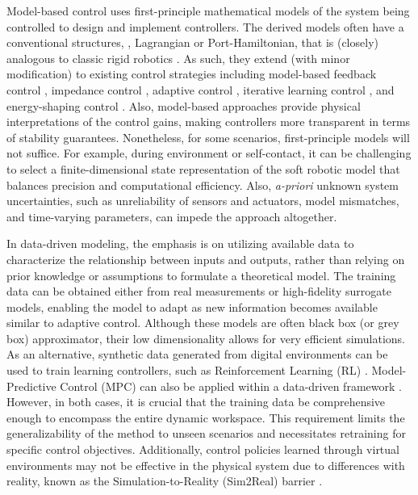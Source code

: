 Model-based control uses first-principle mathematical models of the system being controlled to design and implement controllers. The derived models often have a conventional structures, \eg, Lagrangian or Port-Hamiltonian, that is (closely) analogous to classic rigid robotics \cite{Spong2006,Murray1994,Armanini2023,DellaSantina2021}. As such, they extend (with minor modification) to existing control strategies including model-based feedback control \cite{Falkenhahn2015,Milana2021}, impedance control \cite{DellaSantina2020}, adaptive control \cite{Trumic2020,Kazemipour2022May}, iterative learning control \cite{Hofer2019}, and energy-shaping control \cite{Franco2020,Franco2022,Chang2023,Borja2022Apr}. Also, model-based approaches provide physical interpretations of the control gains, making controllers more transparent in terms of stability guarantees. Nonetheless, for some scenarios, first-principle models will not suffice. For example, during  environment or self-contact, it can be challenging to select a finite-dimensional state representation of the soft robotic model that balances precision and computational efficiency. Also, \textit{a-priori} unknown system uncertainties, such as unreliability of sensors and actuators, model mismatches, and time-varying parameters, can impede the approach altogether.

\par In data-driven modeling, the emphasis is on utilizing available data to characterize the relationship between inputs and outputs, rather than relying on prior knowledge or assumptions to formulate a theoretical model. The training data can be obtained either from real measurements or high-fidelity surrogate models, enabling the model to adapt as new information becomes available similar to adaptive control. Although these models are often black box (or grey box) approximator, their low dimensionality allows for very efficient simulations. As an alternative, synthetic data generated from digital environments can be used to train learning controllers, such as Reinforcement Learning (RL) \cite{Schegg2022,Tekinalp2022}. Model-Predictive Control (MPC) can also be applied within a data-driven framework \cite{Hyatt2020,Bruder2019}. However, in both cases, it is crucial that the training data be comprehensive enough to encompass the entire dynamic workspace. This requirement limits the generalizability of the method to unseen scenarios and necessitates retraining for specific control objectives. Additionally, control policies learned through virtual environments may not be effective in the physical system due to differences with reality, known as the Simulation-to-Reality (Sim2Real) barrier \cite{Kriegman2020}.

